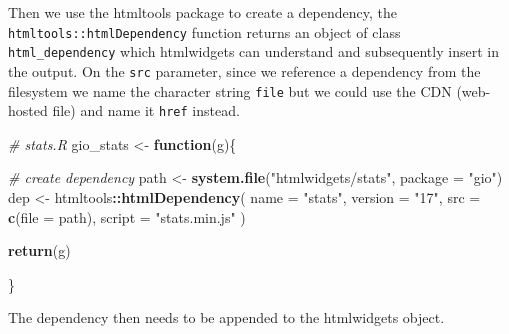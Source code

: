 \documentclass[10pt,]{krantz}
\makeatletter
\newenvironment{Shaded}{\begin{snugshade}}{\end{snugshade}}
\newcommand{\CommentTok}[1]{\textcolor[rgb]{0.37,0.37,0.37}{\textit{#1}}}
\newcommand{\ControlFlowTok}[1]{\textcolor[rgb]{0.27,0.27,0.27}{\textbf{#1}}}
\newcommand{\DataTypeTok}[1]{\textcolor[rgb]{0.27,0.27,0.27}{#1}}
\newcommand{\KeywordTok}[1]{\textcolor[rgb]{0.27,0.27,0.27}{\textbf{#1}}}
\newcommand{\NormalTok}[1]{#1}
\newcommand{\OperatorTok}[1]{\textcolor[rgb]{0.43,0.43,0.43}{\textbf{#1}}}
\newcommand{\StringTok}[1]{\textcolor[rgb]{0.5,0.5,0.5}{#1}}
\newenvironment{kframe}{%
\medskip{}
\setlength{\fboxsep}{.8em}
 \def\at@end@of@kframe{}%
 \ifinner\ifhmode%
  \def\at@end@of@kframe{\end{minipage}}%
  \begin{minipage}{\columnwidth}%
 \fi\fi%
 \def\FrameCommand##1{\hskip\@totalleftmargin \hskip-\fboxsep
 \colorbox{shadecolor}{##1}\hskip-\fboxsep
     \hskip-\linewidth \hskip-\@totalleftmargin \hskip\columnwidth}%
 \MakeFramed {\advance\hsize-\width
   \@totalleftmargin\z@ \linewidth\hsize
   \@setminipage}}%
 {\par\unskip\endMakeFramed%
 \at@end@of@kframe}
\renewenvironment{Shaded}{\begin{kframe}}{\end{kframe}}
\makeatother
\begin{document}
Then we use the htmltools package to create a dependency, the \texttt{htmltools::htmlDependency} function returns an object of class \texttt{html\_dependency} which htmlwidgets can understand and subsequently insert in the output. On the \texttt{src} parameter, since we reference a dependency from the filesystem we name the character string \texttt{file} but we could use the CDN (web-hosted file) and name it \texttt{href} instead.

\begin{Shaded}
\begin{Highlighting}[]
\CommentTok{# stats.R}
\NormalTok{gio_stats <-}\StringTok{ }\ControlFlowTok{function}\NormalTok{(g)\{}

  \CommentTok{# create dependency}
\NormalTok{  path <-}\StringTok{ }\KeywordTok{system.file}\NormalTok{(}\StringTok{"htmlwidgets/stats"}\NormalTok{, }\DataTypeTok{package =} \StringTok{"gio"}\NormalTok{)}
\NormalTok{  dep <-}\StringTok{ }\NormalTok{htmltools}\OperatorTok{::}\KeywordTok{htmlDependency}\NormalTok{(}
    \DataTypeTok{name =} \StringTok{"stats"}\NormalTok{,}
    \DataTypeTok{version =} \StringTok{"17"}\NormalTok{,}
    \DataTypeTok{src =} \KeywordTok{c}\NormalTok{(}\DataTypeTok{file =}\NormalTok{ path),}
    \DataTypeTok{script =} \StringTok{"stats.min.js"}
\NormalTok{  )}

  \KeywordTok{return}\NormalTok{(g)}

\NormalTok{\}}
\end{Highlighting}
\end{Shaded}

The dependency then needs to be appended to the htmlwidgets object.

\begin{Shaded}
\end{Shaded}
\end{document}
